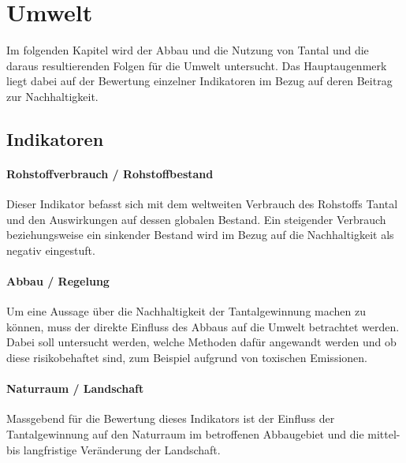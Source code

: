\section{Umwelt}\label{sec:solutions}

Im folgenden Kapitel wird der Abbau und die Nutzung von
Tantal und die daraus resultierenden Folgen für die Umwelt untersucht.
Das Hauptaugenmerk liegt dabei auf der Bewertung einzelner Indikatoren im Bezug
auf deren Beitrag zur Nachhaltigkeit.
\subsection{Indikatoren}

\paragraph{Rohstoffverbrauch / Rohstoffbestand}
Dieser Indikator befasst sich mit dem weltweiten  Verbrauch des Rohstoffs
Tantal und den Auswirkungen auf dessen globalen Bestand. Ein steigender
Verbrauch beziehungsweise ein sinkender Bestand wird im Bezug auf die
Nachhaltigkeit als negativ eingestuft.

\paragraph{Abbau / Regelung}
Um eine Aussage über die Nachhaltigkeit der Tantalgewinnung machen zu können,
muss der direkte Einfluss des Abbaus auf die Umwelt betrachtet werden. Dabei
soll untersucht werden, welche Methoden dafür angewandt werden und ob diese
risikobehaftet sind, zum Beispiel aufgrund von toxischen Emissionen.

\paragraph{Naturraum / Landschaft}
Massgebend für die Bewertung dieses Indikators ist der Einfluss der
Tantalgewinnung auf den Naturraum im betroffenen Abbaugebiet und die mittel- bis
langfristige Veränderung der Landschaft.

